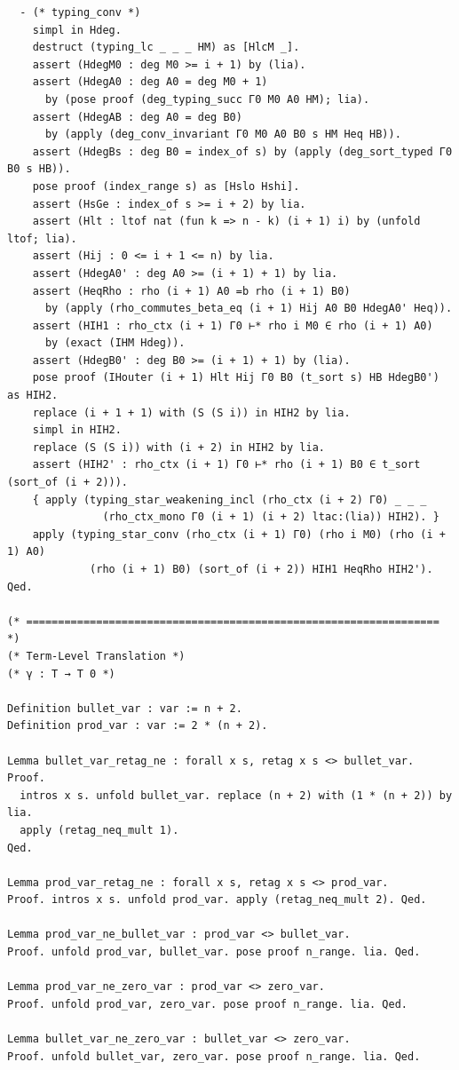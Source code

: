 \begin{latin}
\begin{verbatim}
  - (* typing_conv *)
    simpl in Hdeg.
    destruct (typing_lc _ _ _ HM) as [HlcM _].
    assert (HdegM0 : deg M0 >= i + 1) by (lia).
    assert (HdegA0 : deg A0 = deg M0 + 1)
      by (pose proof (deg_typing_succ Γ0 M0 A0 HM); lia).
    assert (HdegAB : deg A0 = deg B0)
      by (apply (deg_conv_invariant Γ0 M0 A0 B0 s HM Heq HB)).
    assert (HdegBs : deg B0 = index_of s) by (apply (deg_sort_typed Γ0 B0 s HB)).
    pose proof (index_range s) as [Hslo Hshi].
    assert (HsGe : index_of s >= i + 2) by lia.
    assert (Hlt : ltof nat (fun k => n - k) (i + 1) i) by (unfold ltof; lia).
    assert (Hij : 0 <= i + 1 <= n) by lia.
    assert (HdegA0' : deg A0 >= (i + 1) + 1) by lia.
    assert (HeqRho : rho (i + 1) A0 =b rho (i + 1) B0)
      by (apply (rho_commutes_beta_eq (i + 1) Hij A0 B0 HdegA0' Heq)).
    assert (HIH1 : rho_ctx (i + 1) Γ0 ⊢* rho i M0 ∈ rho (i + 1) A0)
      by (exact (IHM Hdeg)).
    assert (HdegB0' : deg B0 >= (i + 1) + 1) by (lia).
    pose proof (IHouter (i + 1) Hlt Hij Γ0 B0 (t_sort s) HB HdegB0') as HIH2.
    replace (i + 1 + 1) with (S (S i)) in HIH2 by lia.
    simpl in HIH2.
    replace (S (S i)) with (i + 2) in HIH2 by lia.
    assert (HIH2' : rho_ctx (i + 1) Γ0 ⊢* rho (i + 1) B0 ∈ t_sort (sort_of (i + 2))).
    { apply (typing_star_weakening_incl (rho_ctx (i + 2) Γ0) _ _ _
               (rho_ctx_mono Γ0 (i + 1) (i + 2) ltac:(lia)) HIH2). }
    apply (typing_star_conv (rho_ctx (i + 1) Γ0) (rho i M0) (rho (i + 1) A0)
             (rho (i + 1) B0) (sort_of (i + 2)) HIH1 HeqRho HIH2').
Qed.

(* ================================================================= *)
(* Term-Level Translation *)
(* γ : T → T 0 *)

Definition bullet_var : var := n + 2.
Definition prod_var : var := 2 * (n + 2).

Lemma bullet_var_retag_ne : forall x s, retag x s <> bullet_var.
Proof.
  intros x s. unfold bullet_var. replace (n + 2) with (1 * (n + 2)) by lia.
  apply (retag_neq_mult 1).
Qed.

Lemma prod_var_retag_ne : forall x s, retag x s <> prod_var.
Proof. intros x s. unfold prod_var. apply (retag_neq_mult 2). Qed.

Lemma prod_var_ne_bullet_var : prod_var <> bullet_var.
Proof. unfold prod_var, bullet_var. pose proof n_range. lia. Qed.

Lemma prod_var_ne_zero_var : prod_var <> zero_var.
Proof. unfold prod_var, zero_var. pose proof n_range. lia. Qed.

Lemma bullet_var_ne_zero_var : bullet_var <> zero_var.
Proof. unfold bullet_var, zero_var. pose proof n_range. lia. Qed.


\end{verbatim}
\end{latin}
